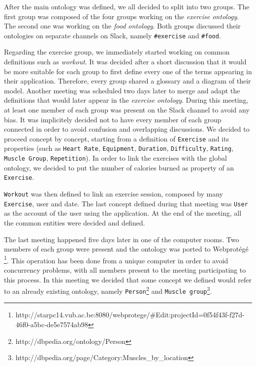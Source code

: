 \documentclass[a4paper]{article}
\begin{document}
After the main ontology was defined, we all decided to split into two groups. The first group was composed of the four groups working on the \textit{exercise ontology}. The second one was working on the \textit{food ontology}. Both groups discussed their ontologies on separate channels on Slack, namely \texttt{\#exercise} and \texttt{\#food}.

Regarding the exercise group, we immediately started working on common definitions such as \textit{workout}. It was decided after a short discussion that it would be more suitable for each group to first define every one of the terms appearing in their application.  Therefore, every group shared a glossary and a diagram of their model. Another meeting was scheduled two days later to merge and adapt the definitions that would later appear in the \textit{exercise ontology}. 
During this meeting, at least one member of each group was present on the Slack channel to avoid any bias. It was implicitely decided not to have every member of each group connected in order to avoid confusion and overlapping discussions. 
We decided to proceed concept by concept, starting from a definition of \texttt{Exercise} and its properties (such as \texttt{Heart Rate}, \texttt{Equipment}, \texttt{Duration}, \texttt{Difficulty}, \texttt{Rating}, \texttt{Muscle Group}, \texttt{Repetition}).
In order to link the exercises with the global ontology, we decided to put the number of calories burned as property of an \texttt{Exercise}.

\texttt{Workout} was then defined to link an exercise session, composed by many \texttt{Exercise}, user and date.
The last concept defined during that meeting was \texttt{User} as the account of the user using the application.
At the end of the meeting, all the common entities were decided and defined.

The last meeting happened five days later in one of the computer rooms. Two members of each group were present and the ontology was ported to Webprotégé \footnote{http://starpc14.vub.ac.be:8080/webprotege/\#Edit:projectId=0f54f43f-f27d-46f0-a5bc-de5e7574ab98}. 
This operation has been done from a unique computer in order to avoid concurrency problems, with all members present to the meeting participating to this process.
In this meeting we decided that some concept we defined would refer to an already existing ontology, namely \texttt{Person}\footnote{http://dbpedia.org/ontology/Person} and \texttt{Muscle group}\footnote{http://dbpedia.org/page/Category:Muscles\_by\_location}.
\end{document}
